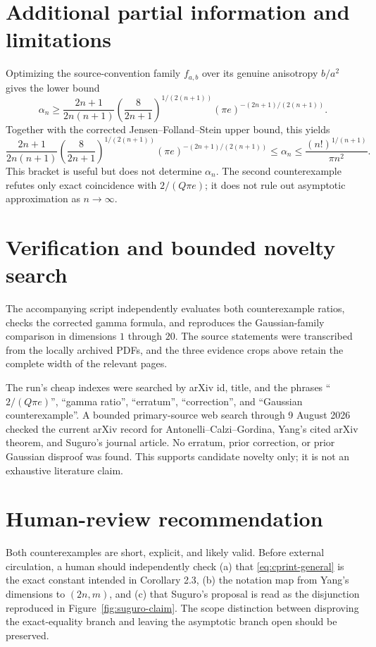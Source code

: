 \documentclass[11pt]{article}
\begin{document}
\section{Additional partial information and limitations}

Optimizing the source-convention family $f_{a,b}$ over its genuine
anisotropy $b/a^2$ gives the lower bound
\[
 \alpha_n\geq
 \frac{2n+1}{2n(n+1)}
 \left(\frac8{2n+1}\right)^{1/(2(n+1))}
 (\pi e)^{-(2n+1)/(2(n+1))}.
\]
Together with the corrected Jensen--Folland--Stein upper bound, this yields
\[
 \frac{2n+1}{2n(n+1)}
 \left(\frac8{2n+1}\right)^{1/(2(n+1))}
 (\pi e)^{-(2n+1)/(2(n+1))}
 \leq\alpha_n\leq\frac{(n!)^{1/(n+1)}}{\pi n^2}.
\]
This bracket is useful but does not determine $\alpha_n$.  The second
counterexample refutes only exact coincidence with $2/(Q\pi e)$; it does not
rule out asymptotic approximation as $n\to\infty$.

\section{Verification and bounded novelty search}

The accompanying script independently evaluates both counterexample ratios,
checks the corrected gamma formula, and reproduces the Gaussian-family
comparison in dimensions $1$ through $20$.  The source statements were
transcribed from the locally archived PDFs, and the three evidence crops above
retain the complete width of the relevant pages.

The run's cheap indexes were searched by arXiv id, title, and the phrases
``$2/(Q\pi e)$'', ``gamma ratio'', ``erratum'', ``correction'', and
``Gaussian counterexample''.  A bounded primary-source web search through
9 August 2026 checked the current arXiv record for Antonelli--Calzi--Gordina,
Yang's cited arXiv theorem, and Suguro's journal article.  No erratum, prior
correction, or prior Gaussian disproof was found.  This supports candidate
novelty only; it is not an exhaustive literature claim.

\section{Human-review recommendation}

Both counterexamples are short, explicit, and likely valid.  Before external
circulation, a human should independently check (a) that
\eqref{eq:cprint-general} is the exact constant intended in Corollary 2.3,
(b) the notation map from Yang's dimensions to $(2n,m)$, and (c) that
Suguro's proposal is read as the disjunction reproduced in
Figure~\ref{fig:suguro-claim}.  The scope distinction between disproving the
exact-equality branch and leaving the asymptotic branch open should be
preserved.
\end{document}
